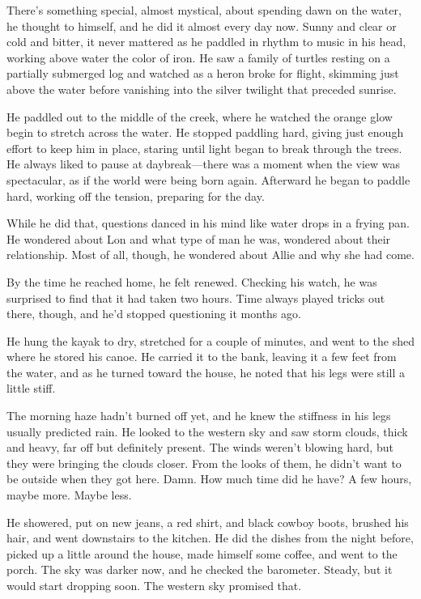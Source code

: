 \documentclass[10pt, twoside, openright]{book}
\begin{document}
There's something special, almost mystical, about spending dawn on the
water, he thought to himself, and he did it almost every day now. Sunny
and clear or cold and bitter, it never mattered as he paddled in rhythm
to music in his head, working above water the color of iron. He saw a
family of turtles resting on a partially submerged log and watched as a
heron broke for flight, skimming just above the water before vanishing
into the silver twilight that preceded sunrise.

He paddled out to the middle of the creek, where he watched the orange
glow begin to stretch across the water. He stopped paddling hard, giving
just enough effort to keep him in place, staring until light began to
break through the trees. He always liked to pause at daybreak---there
was a moment when the view was spectacular, as if the world were being
born again. Afterward he began to paddle hard, working off the tension,
preparing for the day.

While he did that, questions danced in his mind like water drops in a
frying pan. He wondered about Lon and what type of man he was, wondered
about their relationship. Most of all, though, he wondered about Allie
and why she had come.

By the time he reached home, he felt renewed. Checking his watch, he was
surprised to find that it had taken two hours. Time always played tricks
out there, though, and he'd stopped questioning it months ago.

He hung the kayak to dry, stretched for a couple of minutes, and went to
the shed where he stored his canoe. He carried it to the bank, leaving
it a few feet from the water, and as he turned toward the house, he
noted that his legs were still a little stiff.

The morning haze hadn't burned off yet, and he knew the stiffness in his
legs usually predicted rain. He looked to the western sky and saw storm
clouds, thick and heavy, far off but definitely present. The winds
weren't blowing hard, but they were bringing the clouds closer. From the
looks of them, he didn't want to be outside when they got here. Damn.
How much time did he have? A few hours, maybe more. Maybe less.

He showered, put on new jeans, a red shirt, and black cowboy boots,
brushed his hair, and went downstairs to the kitchen. He did the dishes
from the night before, picked up a little around the house, made himself
some coffee, and went to the porch. The sky was darker now, and he
checked the barometer. Steady, but it would start dropping soon. The
western sky promised that.
\end{document}
